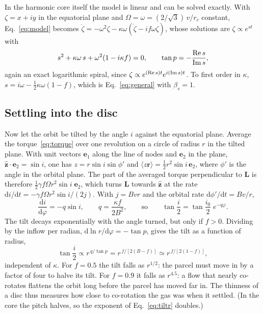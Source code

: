 \documentclass[11pt,a4paper]{article}
\newcommand{\dd}{\mathrm{d}}
\newcommand{\rc}{r_c}
\begin{document}
In the harmonic core itself the model is linear and can be solved exactly. With
$\zeta=x+iy$ in the equatorial plane and $\Omega=\omega=(2/\sqrt3)\,v/\rc$ constant,
Eq.~\eqref{eq:model} becomes
$\ddot\zeta=-\omega^2\zeta-\kappa\omega(\dot\zeta-if\omega\zeta)$, whose solutions
are $\zeta\propto e^{st}$ with
\begin{equation}
  s^2+\kappa\omega\,s+\omega^2(1-i\kappa f)=0,\qquad
  \tan p=-\frac{{\rm Re}\,s}{{\rm Im}\,s},
  \label{eq:core}
\end{equation}
again an exact logarithmic spiral, since $\zeta\propto e^{({\rm Re}\,s)t}e^{i({\rm
Im}\,s)t}$. To first order in $\kappa$, $s=i\omega-\tfrac12\kappa\omega(1-f)$, which
is Eq.~\eqref{eq:general} with $\beta_s=1$.

\subsection{Settling into the disc}
Now let the orbit be tilted by the angle $i$ against the equatorial plane. Average
the torque~\eqref{eq:torque} over one revolution on a circle of radius $r$ in the
tilted plane. With unit vectors $\mathbf e_1$ along the line of nodes and $\mathbf
e_2$ in the plane, $\hat{\mathbf z}\cdot\mathbf e_2=\sin i$, one has $z=r\sin
i\sin\phi'$ and $\langle z\mathbf r\rangle=\tfrac12r^2\sin i\,\mathbf e_2$, where
$\phi'$ is the angle in the orbital plane. The part of the averaged torque
perpendicular to $\mathbf L$ is therefore $\tfrac12\gamma f\Omega r^2\sin i\;\mathbf
e_2$, which turns $\mathbf L$ towards $\hat{\mathbf z}$ at the rate
$\dd i/\dd t=-\gamma f\Omega r^2\sin i/(2j)$. With $j=Bvr$ and the orbital rate
$\dd\phi'/\dd t=Bv/r$,
\begin{equation}
  \frac{\dd i}{\dd\varphi}=-q\sin i,\qquad q=\frac{\kappa f}{2B^2},
  \qquad\text{so}\qquad
  \tan\frac i2=\tan\frac{i_0}2\;e^{-q\varphi}.
  \label{eq:tilt}
\end{equation}
The tilt decays exponentially with the angle turned, but only if $f>0$. Dividing by
the inflow per radian, $\dd\ln r/\dd\varphi=-\tan p$, gives the tilt as a function of
radius,
\begin{equation}
  \tan\frac i2\propto r^{\,q/\tan p}=r^{\,f/[2(B-f)]}\simeq r^{\,f/[2(1-f)]},
  \label{eq:tiltr}
\end{equation}
independent of $\kappa$. For $f=0.5$ the tilt falls as $r^{1/2}$: the parcel must
move in by a factor of four to halve its tilt. For $f=0.9$ it falls as $r^{4.5}$:
a flow that nearly co-rotates flattens the orbit long before the parcel has moved
far in. The thinness of a disc thus measures how close to co-rotation the gas was when
it settled. (In the core the pitch halves, so the exponent of
Eq.~\ref{eq:tiltr} doubles.)
\end{document}
